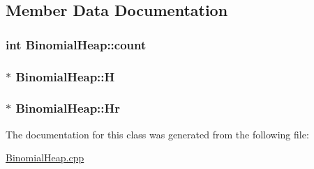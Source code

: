 \subsection{Member Data Documentation}
\subsubsection[{\texorpdfstring{count}{count}}]{\setlength{\rightskip}{0pt plus 5cm}int Binomial\+Heap\+::count\hspace{0.3cm}{\ttfamily [private]}}\hypertarget{classBinomialHeap_ade4b936fdd0d31cf3879cac08b44f38c}{}\label{classBinomialHeap_ade4b936fdd0d31cf3879cac08b44f38c}
\subsubsection[{\texorpdfstring{H}{H}}]{$\ast$ Binomial\+Heap\+::H\hspace{0.3cm}{\ttfamily [private]}}\hypertarget{classBinomialHeap_acf5c4a0779ec8b4306776a525620c5b1}{}\label{classBinomialHeap_acf5c4a0779ec8b4306776a525620c5b1}
\subsubsection[{\texorpdfstring{Hr}{Hr}}]{$\ast$ Binomial\+Heap\+::\+Hr\hspace{0.3cm}{\ttfamily [private]}}\hypertarget{classBinomialHeap_ac1d71f6b98b604dda25fcfcca53cc071}{}\label{classBinomialHeap_ac1d71f6b98b604dda25fcfcca53cc071}


The documentation for this class was generated from the following file\+:\begin{DoxyCompactItemize}
\item 
\hyperlink{BinomialHeap_8cpp}{Binomial\+Heap.\+cpp}\end{DoxyCompactItemize}
